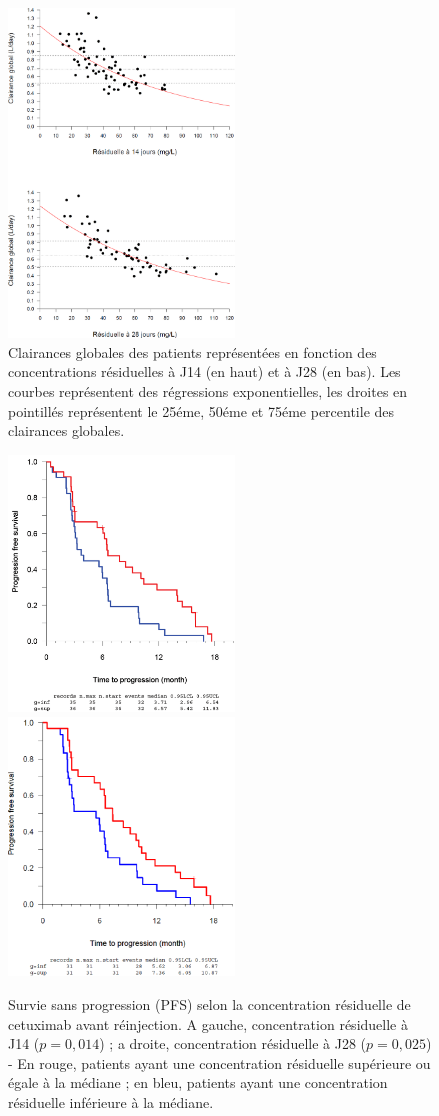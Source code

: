 \begin{figure}[htbp]
	\centering
		\includegraphics[width=6cm]{figures/raster/FIG_30}
	\caption{Clairances globales des patients représentées en fonction des concentrations résiduelles à J14 (en haut) et à J28 (en bas). Les courbes représentent des régressions exponentielles, les droites en pointillés représentent le 25éme, 50éme et 75éme percentile des clairances globales.}
	\label{fig:30}
\end{figure}
\begin{figure}[htbp]
	\centering
		\includegraphics[width=6cm]{figures/raster/FIG_31a}
		\includegraphics[width=6cm]{figures/raster/FIG_31b}
	\caption{Survie sans progression (PFS) selon la concentration résiduelle de cetuximab avant réinjection. A gauche, concentration résiduelle à J14 ($p = 0,014$) ; a droite, concentration résiduelle à J28 ($p = 0,025$) - En rouge, patients ayant une concentration résiduelle supérieure ou égale à la médiane ; en bleu, patients ayant une concentration résiduelle inférieure à la médiane.}
	\label{fig:31}
\end{figure}
